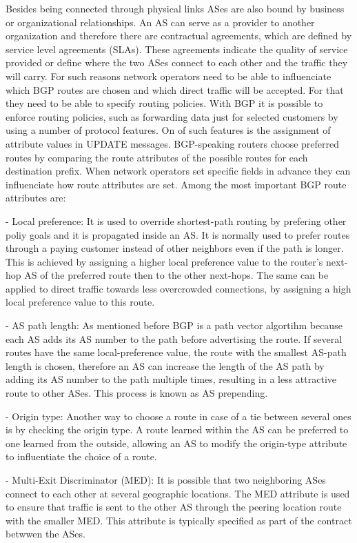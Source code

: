 \documentclass[11pt]{report}
\begin{document}
Besides being connected through physical links ASes are also bound by business or organizational relationships. An AS can serve as a provider to another organization and therefore there are contractual agreements, which are defined by service level agreements (SLAs). These agreements indicate the quality of service provided or define where the two ASes connect to each other and the traffic they will carry. For such reasons network operators need to be able to influenciate which BGP routes are chosen and which direct traffic will be accepted. For that they need to be able to specify routing policies. With BGP it is possible to enforce routing policies, such as forwarding data just for selected customers by using a number of protocol features. On of such features is the assignment of attribute values in UPDATE messages. BGP-speaking routers choose preferred routes by comparing the route attributes of the possible routes for each destination prefix. When network operators set specific fields in advance they can influenciate how route attributes are set. Among the most important BGP route attributes are:

- Local preference: It is used to override shortest-path routing by prefering other poliy goals and it is propagated inside an AS. It is normally used to prefer routes through a paying customer instead of other neighbors even if the path is longer. This is achieved by assigning a higher local preference value to the router's next-hop AS of the preferred route then to the other next-hops. The same can be applied to direct traffic towards less overcrowded connections, by assigning a high local preference value to this route. 

- AS path length: As mentioned before BGP is a path vector algortihm because each AS adds its AS number to the path before advertising the route. If several routes have the same local-preference value, the route with the smallest AS-path length is chosen, therefore an AS can increase the length of the AS path by adding its AS number to the path multiple times, resulting in a less attractive route to other ASes. This process is known as AS prepending.

- Origin type: Another way to choose a route in case of a tie between several ones is by checking the origin type. A route learned within the AS can be preferred to one learned from the outside, allowing an AS to modify the origin-type attribute to influentiate the choice of a route.

- Multi-Exit Discriminator (MED): It is possible that two neighboring ASes connect to each other at several geographic locations. The MED attribute is used to ensure that traffic is sent to the other AS through the peering location route with the smaller MED. This attribute is typically specified as part of the contract betwwen the ASes.
\end{document}
